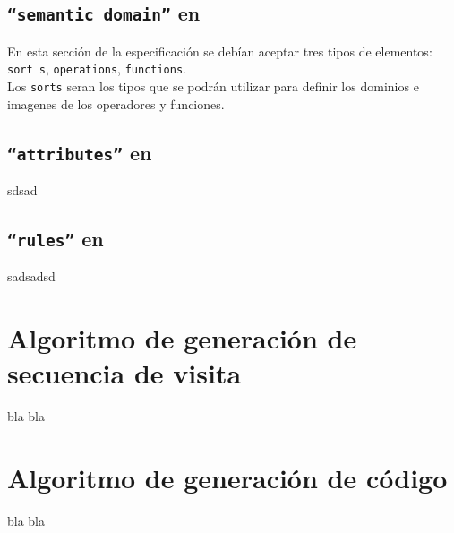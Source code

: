 \subsection{\texttt{``semantic domain''} en \spirit}

En esta sección de la especificación se debían aceptar tres tipos de elementos: \texttt{sort
s}, \texttt{operations}, \texttt{functions}.\\
Los \texttt{sorts} seran los tipos que se podrán utilizar para definir los dominios e imagenes de los operadores y funciones. 


\subsection{\texttt{``attributes''} en \spirit }
sdsad


\subsection{\texttt{``rules''} en \spirit }

sadsadsd

\section{Algoritmo de generaci\'on de secuencia de visita}

bla bla
\section{Algoritmo de generaci\'on de c\'odigo}
bla bla
